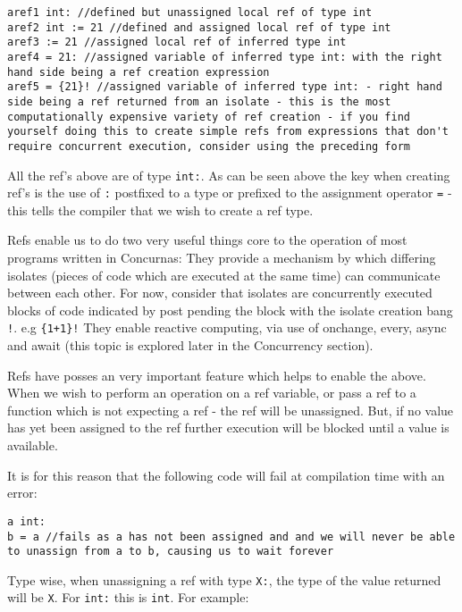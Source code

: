 \documentclass[conc-doc]{subfiles}
\begin{document}
\begin{lstlisting}
aref1 int: //defined but unassigned local ref of type int
aref2 int := 21 //defined and assigned local ref of type int
aref3 := 21 //assigned local ref of inferred type int
aref4 = 21: //assigned variable of inferred type int: with the right hand side being a ref creation expression
aref5 = {21}! //assigned variable of inferred type int: - right hand side being a ref returned from an isolate - this is the most computationally expensive variety of ref creation - if you find yourself doing this to create simple refs from expressions that don't require concurrent execution, consider using the preceding form
\end{lstlisting}

All the ref's above are of type \lstinline{int:}. As can be seen above the key when creating ref's is the use of \lstinline{:} postfixed to a type or prefixed to the assignment operator \lstinline{=} - this tells the compiler that we wish to create a ref type.

Refs enable us to do two very useful things core to the operation of most programs written in Concurnas:
They provide a mechanism by which differing isolates (pieces of code which are executed at the same time) can communicate between each other. For now, consider that isolates are concurrently executed blocks of code indicated by post pending the block with the isolate creation bang \lstinline{!}. e.g \lstinline!{1+1}!\lstinline{!}
They enable reactive computing, via use of onchange, every, async and await (this topic is explored later in the Concurrency section).

Refs have posses an very important feature which helps to enable the above. When we wish to perform an operation on a ref variable, or pass a ref to a function which is not expecting a ref - the ref will be unassigned. But, if no value has yet been assigned to the ref further execution will be blocked until a value is available.

It is for this reason that the following code will fail at compilation time with an error:
\begin{lstlisting}
a int:
b = a //fails as a has not been assigned and and we will never be able to unassign from a to b, causing us to wait forever 
\end{lstlisting}

Type wise, when unassigning a ref with type \lstinline{X:}, the type of the value returned will be \lstinline{X}. For \lstinline{int:} this is \lstinline{int}. For example:
\end{document}

